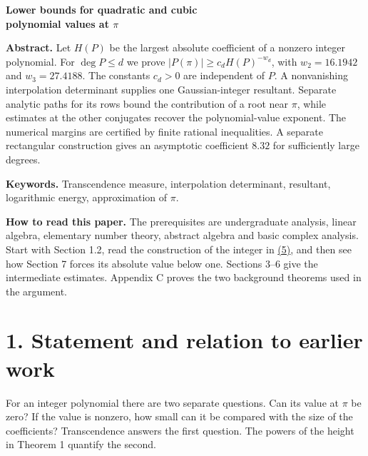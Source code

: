 \documentclass[11pt,a4paper]{article}
\begin{document}
\thispagestyle{plain}
\begin{center}{\LARGE\sffamily\bfseries\color{heading}Lower bounds for quadratic and cubic\\[.08em]polynomial values at \(\pi\)\par}\vspace{.6em}{\large An expository edition for advanced undergraduates\par}\vspace{.35em}{\small 19 November 2026\par}\end{center}
\textbf{Abstract.} Let \(H(P)\) be the largest absolute coefficient of a nonzero integer polynomial. For \(\deg P\le d\) we prove \(|P(\pi)|\ge c_d H(P)^{-w_d}\), with \(w_2=16.1942\) and \(w_3=27.4188\). The constants \(c_d>0\) are independent of \(P\). A nonvanishing interpolation determinant supplies one Gaussian-integer resultant. Separate analytic paths for its rows bound the contribution of a root near \(\pi\), while estimates at the other conjugates recover the polynomial-value exponent. The numerical margins are certified by finite rational inequalities. A separate rectangular construction gives an asymptotic coefficient \(8.32\) for sufficiently large degrees.

\textbf{Keywords.} Transcendence measure, interpolation determinant, resultant, logarithmic energy, approximation of \(\pi\).

\textbf{How to read this paper.} The prerequisites are undergraduate analysis, linear algebra, elementary number theory, abstract algebra and basic complex analysis. Start with Section 1.2, read the construction of the integer in \hyperref[eq:5]{(5)}, and then see how Section 7 forces its absolute value below one. Sections 3--6 give the intermediate estimates. Appendix C proves the two background theorems used in the argument.

\medskip\tableofcontents\clearpage
\section{1. Statement and relation to earlier work}\label{statement-and-relation-to-earlier-work}

For an integer polynomial there are two separate questions. Can its value at \(\pi\) be zero? If the value is nonzero, how small can it be compared with the size of the coefficients? Transcendence answers the first question. The powers of the height in Theorem 1 quantify the second.
\end{document}

